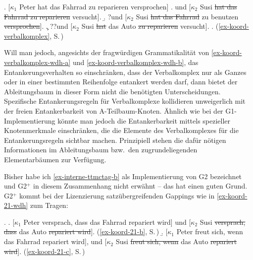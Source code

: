 \ex. [$\kappa_1$ Peter hat das Fahrrad zu reparieren versprochen]\label{ex-koord-verbalkomplex-wdh}
\a. und [$\kappa_2$ Susi \sout{hat das Fahrrad zu reparieren} versucht].
\b. ?und [$\kappa_2$ Susi \sout{hat das Fahrrad} zu benutzen \sout{versprochen}].\label{ex-koord-verbalkomplex-wdh-a}
\c. ??und [$\kappa_2$  Susi \sout{hat} das Auto \sout{zu reparieren} versucht].\label{ex-koord-verbalkomplex-wdh-b}
\z. (\ref{ex-koord-verbalkomplex}, S.\,\pageref{ex-koord-verbalkomplex})

Will man jedoch, angesichts der fragwürdigen Grammatikalität von \ref{ex-koord-verbalkomplex-wdh-a} und \ref{ex-koord-verbalkomplex-wdh-b}, das Entankerungsverhalten so einschränken, dass der Verbalkomplex nur als Ganzes oder in einer bestimmten Reihenfolge entankert werden darf, dann bietet der Ableitungsbaum in dieser Form nicht die benötigten Unterscheidungen. Spezifische Entankerungsregeln für Verbalkomplexe kollidieren unweigerlich mit der freien Entankerbarkeit von A-Teilbaum-Knoten. Ähnlich wie bei der G1-Implementierung könnte man jedoch die Entankerbarkeit mittels spezieller Knotenmerkmale einschränken, die die Elemente des Verbalkomplexes für die Entankerungsregeln sichtbar machen. Prinzipiell stehen die dafür nötigen Informationen im Ableitungsbaum bzw.\ den zugrundeliegenden Elementarbäumen zur Verfügung. 

Bisher habe ich \ref{ex-interne-ttmctag-b} als Implementierung von G2 bezeichnet und G2$^+$ in diesem Zusammenhang nicht erwähnt -- das hat einen guten Grund. G2$^+$ kommt bei der Lizenzierung satzübergreifenden Gappings wie in \ref{ex-koord-21-wdh} zum Tragen:

\ex. \label{ex-koord-21-wdh}
\a. \label{ex-koord-21-b-wdh}[$\kappa_1$ Peter versprach, dass das Fahrrad repariert wird] und [$\kappa_2$ Susi \sout{versprach, dass} das Auto \sout{repariert wird}]. \hfill (\ref{ex-koord-21-b}, S.\,\pageref{ex-koord-21-b})
\b. \label{ex-koord-21-c-wdh}[$\kappa_1$ Peter freut sich, wenn das Fahrrad repariert wird], und [$\kappa_2$ Susi \sout{freut sich, wenn} das Auto \sout{repariert wird}]. \hfill (\ref{ex-koord-21-c}, S.\,\pageref{ex-koord-21-c})

